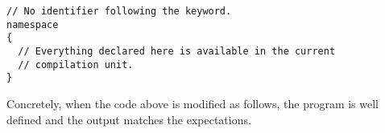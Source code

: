 \begin{lstlisting}
// No identifier following the keyword.
namespace
{
  // Everything declared here is available in the current
  // compilation unit.
}
\end{lstlisting}

Concretely, when the code above is modified as follows, the program
is well defined and the output matches the expectations.




